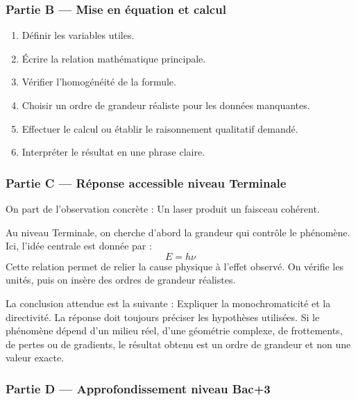 \documentclass[11pt,a4paper]{article}
\begin{document}
\subsubsection*{Partie B — Mise en équation et calcul}

\begin{enumerate}
  \item Définir les variables utiles.
  \item Écrire la relation mathématique principale.
  \item Vérifier l'homogénéité de la formule.
  \item Choisir un ordre de grandeur réaliste pour les données manquantes.
  \item Effectuer le calcul ou établir le raisonnement qualitatif demandé.
  \item Interpréter le résultat en une phrase claire.
\end{enumerate}

\subsubsection*{Partie C — Réponse accessible niveau Terminale}

\begin{corrigebox}
On part de l'observation concrète : Un laser produit un faisceau cohérent.

Au niveau Terminale, on cherche d'abord la grandeur qui contrôle le phénomène. Ici, l'idée centrale est donnée par :
\[
E=h\nu
\]
Cette relation permet de relier la cause physique à l'effet observé. On vérifie les unités, puis on insère des ordres de grandeur réalistes.

La conclusion attendue est la suivante : Expliquer la monochromaticité et la directivité. La réponse doit toujours préciser les hypothèses utilisées. Si le phénomène dépend d'un milieu réel, d'une géométrie complexe, de frottements, de pertes ou de gradients, le résultat obtenu est un ordre de grandeur et non une valeur exacte.
\end{corrigebox}

\subsubsection*{Partie D — Approfondissement niveau Bac+3}
\end{document}
